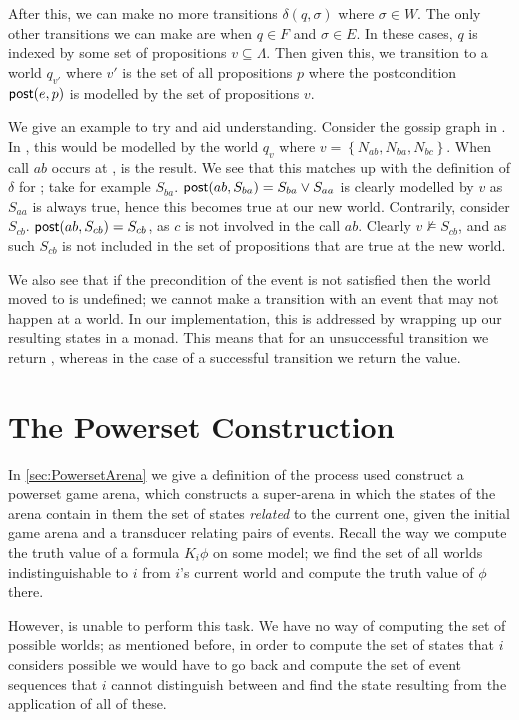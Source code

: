 \documentclass[10pt, a4paper]{report}
\begin{document}
After this, we can make no more transitions $\delta(q, \sigma)$ where $\sigma
\in W$. The only other transitions we can make are when $q \in F$ and $\sigma
\in E$. In these cases, $q$ is indexed by some set of propositions $v \subseteq
\Lambda$. Then given this, we transition to a world $q_{v'}$ where $v'$ is the
set of all propositions $p$ where the postcondition $\textsf{post}(e, p)$ is modelled by
the set of propositions $v$. 

We give an example to try and aid understanding. Consider the gossip graph in
. In \mestar, this would be modelled by the world $q_v$
where $v = \left\{ N_{ab}, N_{ba}, N_{bc} \right\}$. When call $ab$ occurs at
,  is the result. We see that
this matches up with the definition of $\delta$ for \mestar; take for example
$S_{ba}$. $\textsf{post}(ab, S_{ba}) = S_{ba} \lor S_{aa}$ is clearly modelled by $v$ as
$S_{aa}$ is always true, hence this becomes true at our new world. Contrarily,
consider $S_{cb}$. $\textsf{post}(ab, S_{cb}) = S_{cb}$, as $c$ is not involved in the
call $ab$. Clearly $v \not \models S_{cb}$, and as such $S_{cb}$ is not included
in the set of propositions that are true at the new world.

We also see that if the precondition of the event is not satisfied then the
world moved to is undefined; we cannot make a transition with an event that may
not happen at a world. In our implementation, this is addressed by wrapping up
our resulting states in a  monad. This means that for an unsuccessful
transition we return , whereas in the case of a successful
transition we return  the value. 

\section{The Powerset Construction}
\label{sec:PowersetAdapted}

In \ref{sec:PowersetArena} we give a definition of the process used construct a
powerset game arena, which constructs a super-arena in which the states of the
arena contain in them the set of states \emph{related} to the current one, given
the initial game arena and a transducer relating pairs of events. Recall the way
we compute the truth value of a formula $K_i \phi$ on some model; we find the
set of all worlds indistinguishable to $i$ from $i$'s current world and compute
the truth value of $\phi$ there.

However, \mestar is unable to perform this task. We have no way of computing the
set of possible worlds; as mentioned before, in order to compute the set
of states that $i$ considers possible we would have to go back and compute the
set of event sequences that $i$ cannot distinguish between and find the state
resulting from the application of all of these. 
\end{document}
